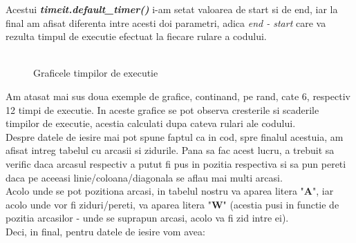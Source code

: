 \documentclass{article}
\begin{document}
\hspace{0cm} Acestui \textbf{\textit{timeit.default\_timer()}} i-am setat valoarea de start si de end, iar la final am afisat diferenta intre acesti doi parametri, adica \textit{end - start} care va rezulta timpul de executie efectuat la fiecare rulare a codului. \\
\\


\begin{figure}%
    \centering
    \qquad
    \caption{Graficele timpilor de executie}%
    \label{fig:example}%
\end{figure}

Am atasat mai sus doua exemple de grafice, continand, pe rand, cate 6, respectiv 12 timpi de executie. In aceste grafice se pot observa cresterile si scaderile timpilor de executie, acestia calculati dupa cateva rulari ale codului. \\

Despre datele de iesire mai pot spune faptul ca in cod, spre finalul acestuia, am afisat intreg tabelul cu arcasii si zidurile. Pana sa fac acest lucru, a trebuit sa verific daca arcasul respectiv a putut fi pus in pozitia respectiva si sa pun pereti daca pe aceeasi linie/coloana/diagonala se aflau mai multi arcasi. \\

Acolo unde se pot pozitiona arcasi, in tabelul nostru va aparea litera "\textbf{A}", iar acolo unde vor fi ziduri/pereti, va aparea litera "\textbf{W}" (acestia pusi in functie de pozitia arcasilor - unde se suprapun arcasi, acolo va fi zid intre ei). \\

Deci, in final, pentru datele de iesire vom avea: \\
\end{document}
